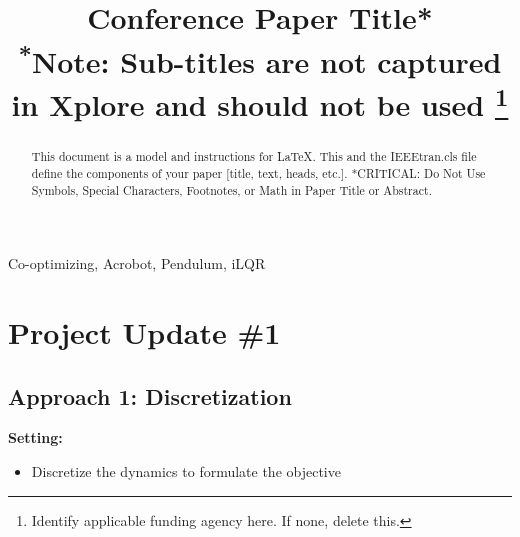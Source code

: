 \documentclass[conference]{IEEEtran}
\begin{document}
\title{Conference Paper Title*\\
{\footnotesize \textsuperscript{*}Note: Sub-titles are not captured in Xplore and
should not be used}
\thanks{Identify applicable funding agency here. If none, delete this.}
}

\author{
\and
{}
}

\maketitle

\begin{abstract}
This document is a model and instructions for \LaTeX.
This and the IEEEtran.cls file define the components of your paper [title, text, heads, etc.]. *CRITICAL: Do Not Use Symbols, Special Characters, Footnotes, 
or Math in Paper Title or Abstract.
\end{abstract}

\begin{IEEEkeywords}
Co-optimizing, Acrobot, Pendulum, iLQR
\end{IEEEkeywords}


\section{Project Update \#1}

\subsection{Approach 1: Discretization}


\textbf{Setting:}
\vspace{-5pt}
\begin{itemize}
    \setlength{\itemsep}{0pt}
    \setlength{\parsep}{0pt}
    \setlength{\parskip}{0pt}
    \item Discretize the dynamics to formulate the objective
\end{itemize}
\end{document}
